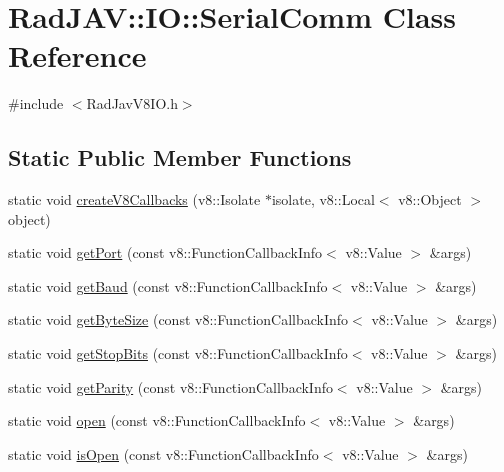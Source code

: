 \hypertarget{class_rad_j_a_v_1_1_i_o_1_1_serial_comm}{}\section{Rad\+J\+AV\+:\+:IO\+:\+:Serial\+Comm Class Reference}
\label{class_rad_j_a_v_1_1_i_o_1_1_serial_comm}


{\ttfamily \#include $<$Rad\+Jav\+V8\+I\+O.\+h$>$}

\subsection*{Static Public Member Functions}
\begin{DoxyCompactItemize}
\item 
static void \mbox{\hyperlink{class_rad_j_a_v_1_1_i_o_1_1_serial_comm_ac9797819a35880ed029654ebb845fbfc}{create\+V8\+Callbacks}} (v8\+::\+Isolate $\ast$isolate, v8\+::\+Local$<$ v8\+::\+Object $>$ object)
\item 
static void \mbox{\hyperlink{class_rad_j_a_v_1_1_i_o_1_1_serial_comm_a5ee54a3635da3ce2e93b60308f7cb726}{get\+Port}} (const v8\+::\+Function\+Callback\+Info$<$ v8\+::\+Value $>$ \&args)
\item 
static void \mbox{\hyperlink{class_rad_j_a_v_1_1_i_o_1_1_serial_comm_aed3dc9a6197679814d6d2adec0e6a3fd}{get\+Baud}} (const v8\+::\+Function\+Callback\+Info$<$ v8\+::\+Value $>$ \&args)
\item 
static void \mbox{\hyperlink{class_rad_j_a_v_1_1_i_o_1_1_serial_comm_a91500a75d86cc06458602f335bc018ba}{get\+Byte\+Size}} (const v8\+::\+Function\+Callback\+Info$<$ v8\+::\+Value $>$ \&args)
\item 
static void \mbox{\hyperlink{class_rad_j_a_v_1_1_i_o_1_1_serial_comm_a12dcde6bd491041cdbd134061b7a4256}{get\+Stop\+Bits}} (const v8\+::\+Function\+Callback\+Info$<$ v8\+::\+Value $>$ \&args)
\item 
static void \mbox{\hyperlink{class_rad_j_a_v_1_1_i_o_1_1_serial_comm_aabd178845a16e997495903d34ed37991}{get\+Parity}} (const v8\+::\+Function\+Callback\+Info$<$ v8\+::\+Value $>$ \&args)
\item 
static void \mbox{\hyperlink{class_rad_j_a_v_1_1_i_o_1_1_serial_comm_a591e1cb96267fb2af1898736202a6c9b}{open}} (const v8\+::\+Function\+Callback\+Info$<$ v8\+::\+Value $>$ \&args)
\item 
static void \mbox{\hyperlink{class_rad_j_a_v_1_1_i_o_1_1_serial_comm_a987f2c2e429e7123ecd1e3aa7689ec1e}{is\+Open}} (const v8\+::\+Function\+Callback\+Info$<$ v8\+::\+Value $>$ \&args)

\end{DoxyCompactItemize}

